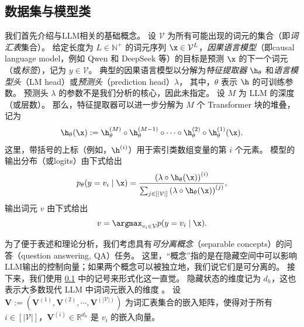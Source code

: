 \subsection{数据集与模型类}\label{subsec:preliminaries}
我们首先介绍与LLM相关的基础概念。
设 $\mathcal{V}$ 为所有可能出现的词元的集合（即\textit{词汇表}集合）。
给定长度为 $L \in \mathbb{N}^{+}$ 的词元序列 $\x \in \mathcal{V}^{L}$，\emph{因果语言模型}（即causal language model，例如 Qwen \cite{DBLP:journals/corr/abs-2505-09388} 和 DeepSeek \cite{DBLP:journals/corr/abs-2412-19437}等）的目标是预测 $\x$ 的下一个词元（或\textit{标签}），记为 $y \in \mathcal{V}$。 
典型的因果语言模型以分解为\textit{特征提取器} $\h_{\theta}$ 和\textit{语言模型头}（LM head）或\textit{预测头}（prediction head）$\lambda$，
其中，$\theta$ 表示 $\h$ 的可训练参数。
预测头 $\lambda$ 的参数不是我们分析的核心，因此未指定。
设 $M$ 为 LLM 的深度（或层数）。
那么，特征提取器可以进一步分解为 $M$ 个 Transformer 块的堆叠，记为
\begin{equation}\label{eq:def transformer blocks}
    \h_\theta(\x) := \h_{\theta}^{(M)} \circ \h_{\theta}^{(M-1)} \circ \cdots \circ \h_{\theta}^{(2)} \circ \h_{\theta}^{(1)}(\x).
\end{equation}
这里，带括号的上标（例如，$\h^{(i)}$）用于索引类数组变量的第 $i$ 个元素。
模型的输出分布（或logits）由下式给出
\begin{equation}\label{eq:def logits dist}
    p_{\theta}(y = v_i \mid \x) = \frac{\left(\lambda \circ \h_{\theta} (\x)\right)^{(i)}}{\sum_{j \in [|\mathcal{V}|]} \left(\lambda \circ \h_{\theta} (\x)\right)^{(j)} },
\end{equation}
输出词元 $v$ 由下式给出
\begin{equation}
     v = \argmax_{v_i \in \mathcal{V}} p(y = v_i \mid \x).
\end{equation}

为了便于表述和理论分析，我们考虑具有\textit{可分离概念}（separable concepts）的问答（question answering, QA）任务。
这里，“概念”指的是在隐藏空间中可以影响LLM输出的控制向量；如果两个概念可以被独立地，我们说它们是可分离的。
接下来，我们使用 \cref{subsec:preliminaries} 中的记号来形式化这一直觉。
隐藏状态的维度记为 $d_{h}$，这也表示大多数现代 LLM 中词词元嵌入的维度 \cite{DBLP:journals/corr/abs-2505-09388,DBLP:journals/corr/abs-2412-19437}。 
设 $\boldsymbol{V} := (\boldsymbol{V}^{(1)}, \boldsymbol{V}^{(2)}, \cdots, \boldsymbol{V}^{(|\mathcal{V}|)})$ 为词汇表集合的嵌入矩阵，使得对于所有 $i \in [|\mathcal{V}|]$，$\boldsymbol{V}^{(i)} \in \mathbb{R}^{d_h}$ 是 $v_i$ 的嵌入向量。

